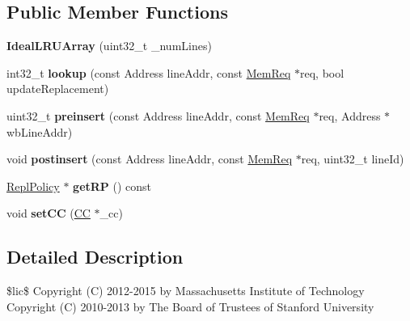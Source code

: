 \subsection*{Public Member Functions}
\begin{DoxyCompactItemize}
\item 
\hypertarget{classIdealLRUArray_af1a4102b2fef0241d63f0e801e89f2e1}{{\bfseries Ideal\-L\-R\-U\-Array} (uint32\-\_\-t \-\_\-num\-Lines)}\label{classIdealLRUArray_af1a4102b2fef0241d63f0e801e89f2e1}

\item 
\hypertarget{classIdealLRUArray_aee6f323e0bc32079036d7e4a9c6933a1}{int32\-\_\-t {\bfseries lookup} (const Address line\-Addr, const \hyperlink{structMemReq}{Mem\-Req} $\ast$req, bool update\-Replacement)}\label{classIdealLRUArray_aee6f323e0bc32079036d7e4a9c6933a1}

\item 
\hypertarget{classIdealLRUArray_a1bbd715a516bd619a7616278af19c835}{uint32\-\_\-t {\bfseries preinsert} (const Address line\-Addr, const \hyperlink{structMemReq}{Mem\-Req} $\ast$req, Address $\ast$wb\-Line\-Addr)}\label{classIdealLRUArray_a1bbd715a516bd619a7616278af19c835}

\item 
\hypertarget{classIdealLRUArray_a7bb8b248770283b7083a242d825ff795}{void {\bfseries postinsert} (const Address line\-Addr, const \hyperlink{structMemReq}{Mem\-Req} $\ast$req, uint32\-\_\-t line\-Id)}\label{classIdealLRUArray_a7bb8b248770283b7083a242d825ff795}

\item 
\hypertarget{classIdealLRUArray_ab4ed72c6342be5ff2e6c47bab63068ce}{\hyperlink{classReplPolicy}{Repl\-Policy} $\ast$ {\bfseries get\-R\-P} () const }\label{classIdealLRUArray_ab4ed72c6342be5ff2e6c47bab63068ce}

\item 
\hypertarget{classIdealLRUArray_a7dfad52e5897a8816334c038d103fd3a}{void {\bfseries set\-C\-C} (\hyperlink{classCC}{C\-C} $\ast$\-\_\-cc)}\label{classIdealLRUArray_a7dfad52e5897a8816334c038d103fd3a}

\end{DoxyCompactItemize}


\subsection{Detailed Description}
\$lic\$ Copyright (C) 2012-\/2015 by Massachusetts Institute of Technology Copyright (C) 2010-\/2013 by The Board of Trustees of Stanford University

